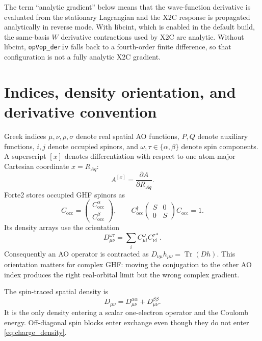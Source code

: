 \documentclass[aip,jcp,preprint]{revtex4-1}
\newcommand{\Tr}{\operatorname{Tr}}
\newcommand{\xcoord}{{[x]}}
\begin{document}
The term ``analytic gradient'' below means that the wave-function derivative
is evaluated from the stationary Lagrangian and the X2C response is propagated
analytically in reverse mode.  With libcint, which is enabled in the default
build, the same-basis $W$ derivative contractions used by X2C are analytic.
Without libcint, \texttt{opVop\_deriv} falls back to a fourth-order finite
difference, so that configuration is not a fully analytic X2C gradient.

\section{Indices, density orientation, and derivative convention}

Greek indices $\mu,\nu,\rho,\sigma$ denote real spatial AO functions, $P,Q$
denote auxiliary functions, $i,j$ denote occupied spinors, and
$\omega,\tau\in\{\alpha,\beta\}$ denote spin components.  A superscript
$\xcoord$ denotes differentiation with respect to one atom-major Cartesian
coordinate $x=R_{Aq}$:
\begin{equation}
 A^\xcoord = \frac{\partial A}{\partial R_{Aq}}.
\end{equation}
Forte2 stores occupied GHF spinors as
\begin{equation}
 C_{\mathrm{occ}} =
 \begin{pmatrix} C^\alpha_{\mathrm{occ}} \\ C^\beta_{\mathrm{occ}}\end{pmatrix},
 \qquad
 C_{\mathrm{occ}}^\dagger
 \begin{pmatrix}S&0\\0&S\end{pmatrix}
 C_{\mathrm{occ}}=1.
\end{equation}
Its density arrays use the orientation
\begin{equation}
 D^{\omega\tau}_{\mu\nu}
 = \sum_i C^\omega_{\mu i} C^{\tau *}_{\nu i}.
 \label{eq:ghf_density_blocks}
\end{equation}
Consequently an AO operator is contracted as
$D_{\nu\mu}h_{\mu\nu}=\Tr(Dh)$.  This orientation matters for complex GHF:
moving the conjugation to the other AO index produces the right real-orbital
limit but the wrong complex gradient.

The spin-traced spatial density is
\begin{equation}
 D_{\mu\nu}=D^{\alpha\alpha}_{\mu\nu}
             +D^{\beta\beta}_{\mu\nu}.
 \label{eq:charge_density}
\end{equation}
It is the only density entering a scalar one-electron operator and the Coulomb
energy.  Off-diagonal spin blocks enter exchange even though they do not enter
\cref{eq:charge_density}.
\end{document}

